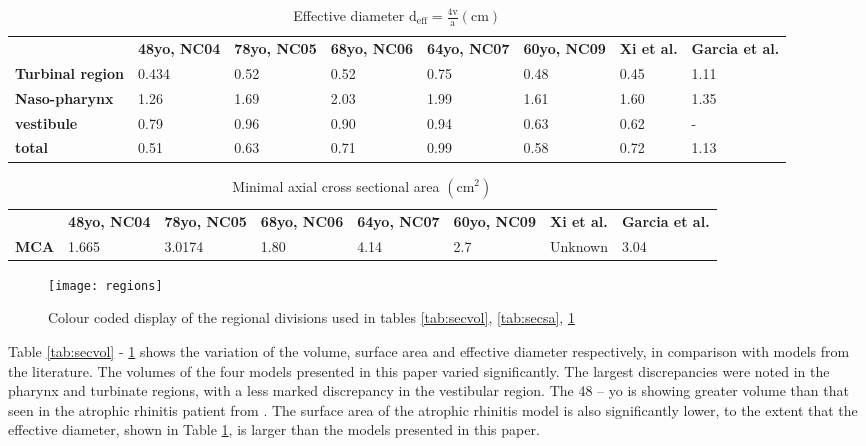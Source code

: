 \begin{table}
  \begin{tabular}{p{}p{}p{}p{}p{}p{}p{}p{}}
& \textbf{48yo, NC04}  & \textbf{78yo, NC05} & \textbf{68yo, NC06} & \textbf{64yo, NC07} & \textbf{60yo, NC09} & \textbf{Xi et al.} & \textbf{Garcia et al.}\\
 \cline{2-8}
\textbf{Turbinal region} & 0.434 & 0.52 & 0.52 & 0.75 & 0.48 & 0.45 & 1.11\\
\textbf{Naso-pharynx} & 1.26 & 1.69 & 2.03 & 1.99 & 1.61 & 1.60 & 1.35\\
\textbf{vestibule} & 0.79 & 0.96 & 0.90 & 0.94 & 0.63 & 0.62 &  - \\
\textbf{total} & 0.51 & 0.63 & 0.71 & 0.99 & 0.58 & 0.72 & 1.13 \\
\hline
\end{tabular}
\caption{Effective diameter $\mathrm{d_{eff} = \frac{4v}{a} (cm)}$}\label{tab:deff}
\end{table}
\begin{table}
  \begin{tabular}{p{}p{}p{}p{}p{}p{}p{}p{}}
& \textbf{48yo, NC04}  & \textbf{78yo, NC05} & \textbf{68yo, NC06} & \textbf{64yo, NC07} & \textbf{60yo, NC09} & \textbf{Xi et al.} & \textbf{Garcia et al.}\\
 \cline{2-8}
 \textbf{MCA}&1.665&3.0174&1.80&4.14&2.7&Unknown&3.04
\end{tabular}
\caption{Minimal axial cross sectional area $\mathrm{(cm^2)}$}\label{tab:mca}
\end{table}

\begin{figure}
\centering
\texttt{[image: regions]}
\caption{Colour coded display of the regional divisions used in tables \ref{tab:secvol}, \ref{tab:secsa}, \ref{tab:deff}} 
\label{fig:regions}
\end{figure} 

Table \ref{tab:secvol} - \ref{tab:deff} shows the variation of the volume, surface area and effective diameter respectively, in comparison with models from the literature. The volumes of the four models presented in this paper varied significantly. The largest discrepancies were noted in the pharynx and turbinate regions, with a less marked discrepancy in the vestibular region. The 48 – yo is showing greater volume than that seen in the atrophic rhinitis patient from \cite{Garcia2007}. The surface area of the atrophic rhinitis model is also significantly lower, to the extent that the effective diameter, shown in Table \ref{tab:deff}, is larger than the models presented in this paper.

